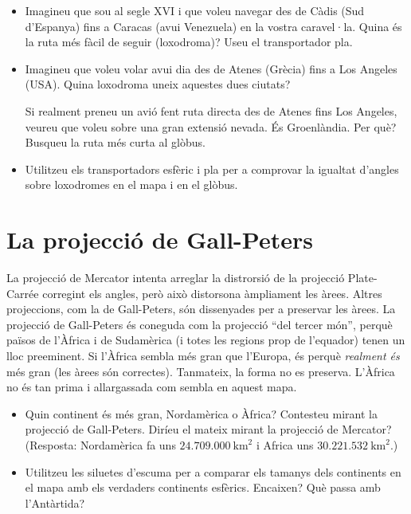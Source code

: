 \documentclass[a4paper,12pt]{article}
\begin{document}
\begin{itemize}
 \item Imagineu que sou al segle XVI i que voleu navegar des de Càdis (Sud d'Espanya) fins a Caracas (avui Venezuela) en la vostra caravel·la. Quina és la ruta més fàcil de seguir (loxodroma)? Useu el transportador pla.

 \item Imagineu que voleu volar avui dia des de Atenes (Grècia) fins a Los Angeles (USA). Quina loxodroma uneix aquestes dues ciutats?
 
 Si realment preneu un avió fent ruta directa des de Atenes fins Los Angeles, veureu que voleu sobre una gran extensió nevada. És Groenlàndia. Per què? Busqueu la ruta més curta al glòbus.

 \item Utilitzeu els transportadors esfèric i pla per a comprovar la igualtat d'angles sobre loxodromes en el mapa i en el glòbus.
\end{itemize}



\newpage
\section{La projecció de Gall-Peters}
La projecció de Mercator intenta arreglar la distrorsió de la projecció Plate-Carrée corregint els angles, però això distorsona àmpliament les àrees. Altres projeccions, com la de Gall-Peters, són dissenyades per a preservar les àrees. La projecció de Gall-Peters és coneguda com la projecció ``del tercer món'', perquè països de l'Àfrica i de Sudamèrica (i totes les regions prop de l'equador) tenen un lloc preeminent. Si l'Àfrica sembla més gran que l'Europa, és perquè \emph{realment és} més gran (les àrees són correctes). Tanmateix, la forma no es preserva. L'Àfrica no és tan prima i allargassada com sembla en aquest mapa.

\begin{itemize}
 \item Quin continent és més gran, Nordamèrica o Àfrica? Contesteu mirant la projecció de Gall-Peters. Diríeu el mateix mirant la projecció de Mercator? (Resposta: Nordamèrica fa uns $24.709.000\ \mathrm{km}^2$ i Africa uns $30.221.532\ \mathrm{km}^2$.)

 \item Utilitzeu les siluetes d'escuma per a comparar els tamanys dels continents en el mapa amb els verdaders continents esfèrics. Encaixen? Què passa amb l'Antàrtida?
\end{itemize}
\end{document}
